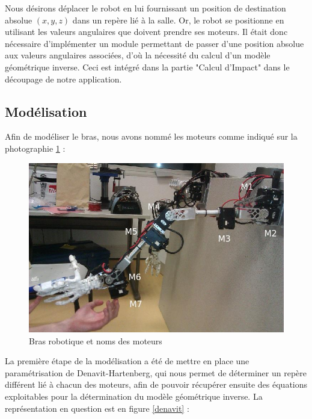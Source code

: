 Nous désirons déplacer le robot en lui fournissant un position de destination absolue $(x, y, z)$ dans un repère lié à la salle. Or, le robot se positionne en utilisant les valeurs angulaires que doivent prendre ses moteurs. Il était donc nécessaire d'implémenter un module permettant de passer d'une position absolue aux valeurs angulaires associées, d'où la nécessité du calcul d'un modèle géométrique inverse. Ceci est intégré dans la partie "Calcul d'Impact" dans le découpage de notre application.

\subsection{Modélisation}

Afin de modéliser le bras, nous avons nommé les moteurs comme indiqué sur la photographie \ref{moteurs} :\\

\begin{figure}[!htc]
	\begin{center}
		\includegraphics[scale=0.6]{images/robot1.jpg}
		\caption{Bras robotique et noms des moteurs} 
		\label{moteurs}
	\end{center}
\end{figure}

La première étape de la modélisation a été de mettre en place une paramétrisation de Denavit-Hartenberg, qui nous permet de déterminer un repère différent lié à chacun des moteurs, afin de pouvoir récupérer ensuite des équations exploitables pour la détermination du modèle géométrique inverse.
\newpage
La représentation en question est en figure \ref{denavit} :\\

